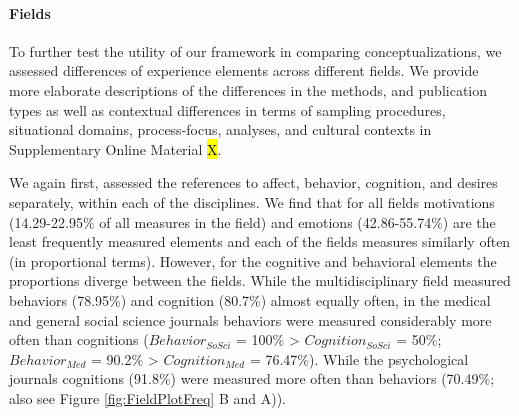 \paragraph{Fields}

To further test the utility of our framework in comparing
conceptualizations, we assessed differences of experience elements
across different fields. We provide more elaborate descriptions of the
differences in the methods, and publication types as well as contextual
differences in terms of sampling procedures, situational domains,
process-focus, analyses, and cultural contexts in Supplementary Online
Material \hl{X}.

We again first, assessed the references to affect, behavior, cognition,
and desires separately, within each of the disciplines. We find that for
all fields motivations (14.29-22.95\% of all measures in the field) and
emotions (42.86-55.74\%) are the least frequently measured elements and
each of the fields measures similarly often (in proportional terms).
However, for the cognitive and behavioral elements the proportions
diverge between the fields. While the multidisciplinary field measured
behaviors (78.95\%) and cognition (80.7\%) almost equally often, in the
medical and general social science journals behaviors were measured
considerably more often than cognitions (\(Behavior_{SoSci}\) = 100\%
\textgreater{} \(Cognition_{SoSci}\) = 50\%; \(Behavior_{Med}\) = 90.2\%
\textgreater{} \(Cognition_{Med}\) = 76.47\%). While the psychological
journals cognitions (91.8\%) were measured more often than behaviors
(70.49\%; also see Figure \ref{fig:FieldPlotFreq} B and A)).

